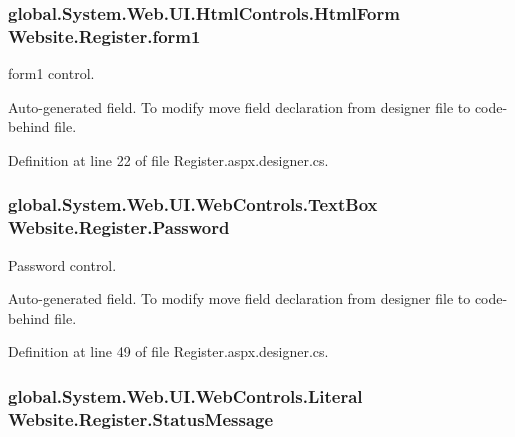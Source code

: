 \hypertarget{class_website_1_1_register_ac0b3a35ad4ca980bf80cb5bbabfedf8a}{}
\subsubsection[{form1}]{\setlength{\rightskip}{0pt plus 5cm}global.\+System.\+Web.\+U\+I.\+Html\+Controls.\+Html\+Form Website.\+Register.\+form1\hspace{0.3cm}{\ttfamily [protected]}}\label{class_website_1_1_register_ac0b3a35ad4ca980bf80cb5bbabfedf8a}


form1 control. 

Auto-\/generated field. To modify move field declaration from designer file to code-\/behind file. 

Definition at line 22 of file Register.\+aspx.\+designer.\+cs.

\hypertarget{class_website_1_1_register_a90fa0de877498ce7b5c52a107bf9eff6}{}
\subsubsection[{Password}]{\setlength{\rightskip}{0pt plus 5cm}global.\+System.\+Web.\+U\+I.\+Web\+Controls.\+Text\+Box Website.\+Register.\+Password\hspace{0.3cm}{\ttfamily [protected]}}\label{class_website_1_1_register_a90fa0de877498ce7b5c52a107bf9eff6}


Password control. 

Auto-\/generated field. To modify move field declaration from designer file to code-\/behind file. 

Definition at line 49 of file Register.\+aspx.\+designer.\+cs.

\hypertarget{class_website_1_1_register_ad6b033d11223099045071793a539ff7f}{}
\subsubsection[{Status\+Message}]{\setlength{\rightskip}{0pt plus 5cm}global.\+System.\+Web.\+U\+I.\+Web\+Controls.\+Literal Website.\+Register.\+Status\+Message\hspace{0.3cm}{\ttfamily [protected]}}\label{class_website_1_1_register_ad6b033d11223099045071793a539ff7f}


